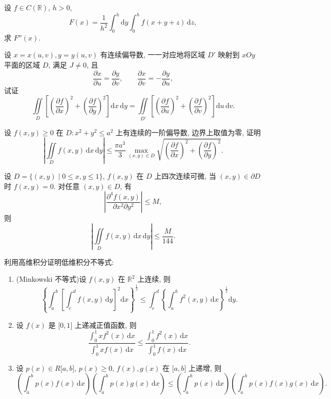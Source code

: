 \documentclass[../数学分析培优讲义.tex]{subfiles}
\begin{document}
\begin{example}
设 $f\in C(\mathbb{R})$, $h>0$,
\[
    F(x)=\dfrac{1}{h^2}\int_0^h\mathrm{d}y\int_0^h f(x+y+z)\,\mathrm{d}z,
\]
求 $F''(x)$.
\end{example}
\exampleblank

\begin{example}
设 $x=x(u,v),y=y(u,v)$ 有连续偏导数, 一一对应地将区域 $D'$ 映射到 $xOy$ 平面的区域 $D$, 满足 $J\ne0$, 且
\[
    \dfrac{\partial x}{\partial u}=\dfrac{\partial y}{\partial v},\qquad
    \dfrac{\partial x}{\partial v}=-\dfrac{\partial y}{\partial u},
\]
试证
\[
    \iint\limits_D\left[\left(\dfrac{\partial f}{\partial x}\right)^2+
    \left(\dfrac{\partial f}{\partial y}\right)^2\right]\mathrm{d}x\,\mathrm{d}y
    =\iint\limits_{D'}\left[\left(\dfrac{\partial f}{\partial u}\right)^2+
    \left(\dfrac{\partial f}{\partial v}\right)^2\right]\mathrm{d}u\,\mathrm{d}v.
\]
\end{example}
\exampleblank

\begin{example}
设 $f(x,y)\geq0$ 在 $D:x^2+y^2\leq a^2$ 上有连续的一阶偏导数, 边界上取值为零, 证明
\[
    \left|\iint\limits_Df(x,y)\,\mathrm{d}x\,\mathrm{d}y\right|
    \leq\dfrac{\pi a^3}{3}
    \max_{(x,y)\in D}\sqrt{\left(\dfrac{\partial f}{\partial x}\right)^2+
    \left(\dfrac{\partial f}{\partial y}\right)^2}.
\]
\end{example}
\exampleblank

\begin{example}
设 $D=\{(x,y)\mid0\leq x,y\leq1\}$, $f(x,y)$ 在 $D$ 上四次连续可微, 当 $(x,y)\in\partial D$ 时 $f(x,y)=0$. 对任意 $(x,y)\in D$, 有
\[
    \left|\dfrac{\partial^4f(x,y)}{\partial x^2\partial y^2}\right|\leq M,
\]
则
\[
    \left|\iint\limits_Df(x,y)\,\mathrm{d}x\,\mathrm{d}y\right|\leq\dfrac{M}{144}.
\]
\end{example}
\exampleblank

\begin{example}[\markstar]
利用高维积分证明低维积分不等式:
\begin{enumerate}[label=(\arabic*)]
    \item (Minkowski 不等式)设 $f(x,y)$ 在 $\mathbb{R}^2$ 上连续, 则
    \[
        \left\{\int_a^b\left[\int_c^d f(x,y)\,\mathrm{d}y\right]^2\mathrm{d}x\right\}^{\frac{1}{2}}
        \leq
        \int_c^d\left\{\int_a^b f^2(x,y)\,\mathrm{d}x\right\}^{\frac{1}{2}}\mathrm{d}y.
    \]
    \item 设 $f(x)$ 是 $\lbrack0,1\rbrack$ 上递减正值函数, 则
    \[
        \dfrac{\displaystyle\int_0^1x f^2(x)\,\mathrm{d}x}
        {\displaystyle\int_0^1x f(x)\,\mathrm{d}x}
        \leq
        \dfrac{\displaystyle\int_0^1 f^2(x)\,\mathrm{d}x}
        {\displaystyle\int_0^1 f(x)\,\mathrm{d}x}.
    \]
    \item 设 $p(x)\in R\lbrack a,b\rbrack$, $p(x)\geq0$, $f(x),g(x)$ 在 $\lbrack a,b\rbrack$ 上递增, 则
    \[
        \left(\int_a^bp(x)f(x)\,\mathrm{d}x\right)
        \left(\int_a^bp(x)g(x)\,\mathrm{d}x\right)
        \leq
        \left(\int_a^bp(x)\,\mathrm{d}x\right)
        \left(\int_a^bp(x)f(x)g(x)\,\mathrm{d}x\right).
    \]
\end{enumerate}
\end{example}
\exampleblank
\end{document}
